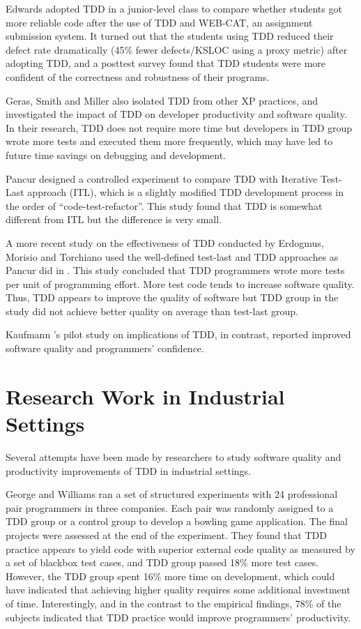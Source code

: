 Edwards \cite{Edwards:04} adopted TDD in a junior-level class to compare
whether students got more reliable code after the use of TDD and WEB-CAT,
an assignment submission system. It turned out that the students using TDD
reduced their defect rate dramatically (45\% fewer defects/KSLOC using a
proxy metric) after adopting TDD, and a posttest survey found that TDD
students were more confident of the correctness and robustness of their
programs.

Geras, Smith and Miller \cite{Geras:04} also isolated TDD from other XP
practices, and investigated the impact of TDD on developer productivity and
software quality. In their research, TDD does not require more time but
developers in TDD group wrote more tests and executed them more frequently,
which may have led to future time savings on debugging and development.

Pancur \cite{Matjaz:03} designed a controlled experiment to compare TDD
with Iterative Test-Last approach (ITL), which is a slightly modified TDD
development process in the order of ``code-test-refactor''.  This study
found that TDD is somewhat different from ITL but the difference is very
small.

A more recent study on the effectiveness of TDD conducted by Erdogmus,
Morisio and Torchiano \cite{Erdogmus:05} used the well-defined test-last
and TDD approaches as Pancur did in \cite{Matjaz:03}. This study concluded
that TDD programmers wrote more tests per unit of programming effort. More
test code tends to increase software quality. Thus, TDD appears to improve
the quality of software but TDD group in the study did not achieve better
quality on average than test-last group.

Kaufmann \cite{Kaufmann:03}'s pilot study on implications of TDD, in
contrast, reported improved software quality and programmers' confidence.

\section{Research Work in Industrial Settings}
Several attempts have been made by researchers to study software quality
and productivity improvements of TDD in industrial settings.  

George and Williams \cite{George:04} ran a set of structured experiments
with 24 professional pair programmers in three companies. Each pair was
randomly assigned to a TDD group or a control group to develop a bowling
game application. The final projects were assessed at the end of the
experiment.  They found that TDD practice appears to yield code with
superior external code quality as measured by a set of blackbox test cases,
and TDD group passed 18\% more test cases. However, the TDD group spent
16\% more time on development, which could have indicated that achieving
higher quality requires some additional investment of time. Interestingly,
and in the contrast to the empirical findings, 78\% of the subjects
indicated that TDD practice would improve programmers' productivity.

